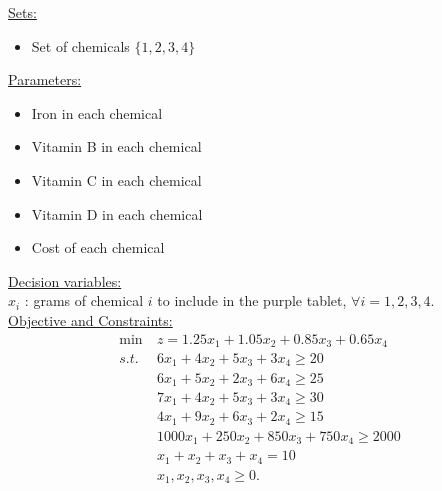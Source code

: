    
    \begin{solution}
    
    \smallskip \underline{Sets:}
    \begin{itemize}
    \item Set of chemicals $\{1,2,3,4\}$
    \end{itemize}
    \smallskip \underline{Parameters:}
    \begin{itemize}
    \item Iron in each chemical
    \item Vitamin B in each chemical
    \item Vitamin C in each chemical
    \item Vitamin D in each chemical
    \item Cost of each chemical
    \end{itemize}
    \smallskip \underline{Decision variables:} \\
    $x_i$ : grams of chemical $i$ to include in the purple tablet, $\forall i = 1,2,3,4$.\\
    \smallskip \underline{Objective and Constraints:}
    \begin{align*}
    \min\ & z = 1.25x_1 + 1.05x_2 + 0.85x_3 + 0.65x_4 \\
    s.t. &  6x_1 + 4x_2 + 5x_3 + 3x_4 \ge 20 \\
    & 6x_1 + 5x_2 + 2x_3 + 6x_4 \ge 25  \\
    & 7x_1 + 4x_2 + 5x_3 + 3x_4 \ge 30  \\
    & 4x_1 + 9x_2 + 6x_3 + 2x_4 \ge 15  \\
    & 1000x_1 + 250x_2 + 850x_3 + 750x_4 \ge 2000 \\
    & x_1 + x_2 + x_3 + x_4 = 10  \\
    & x_1, x_2, x_3, x_4 \ge 0. 
    \end{align*}
    
    \end{solution}
    